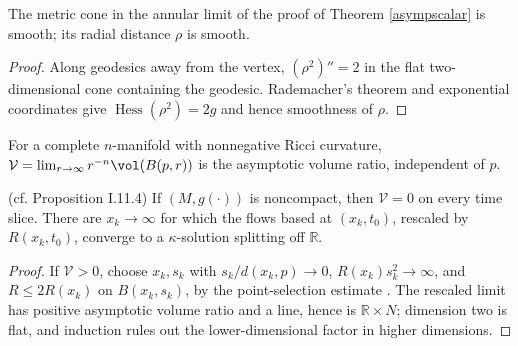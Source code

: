 \begin{lemma}
\label{lem:kl-asymptotic-scalar-curvature-asymptotic-volume-ratio-scalar-curvature-lemma}

The metric cone in the annular limit of the proof of
Theorem \ref{asympscalar} is smooth; its radial distance $\rho$ is smooth.
\end{lemma}
\begin{proof}
\sketch Along geodesics away from the vertex, $(\rho^2)''=2$ in the flat
two-dimensional cone containing the geodesic.  Rademacher's theorem and
exponential coordinates give $\operatorname{Hess}(\rho^2)=2g$ and hence
smoothness of $\rho$.
\end{proof}
\begin{definition}
\label{def:kl-asymptotic-scalar-curvature-asymptotic-volume-ratio-asymptotic-volume-ratio-definition}

For a complete $n$-manifold with nonnegative Ricci curvature,
$\mathcal V=\lim_{r\to\infty}r^{-n}\vol(B(p,r))$ is the asymptotic volume
ratio, independent of $p$.
\end{definition}
\begin{proposition}
\label{prop:kl-asymptotic-scalar-curvature-asymptotic-volume-ratio-existence-kappa-solutions}

(cf. Proposition I.11.4) \label{propI.11.4}
If $(M,g(\cdot))$ is noncompact, then $\mathcal V=0$ on every time slice.
There are $x_k\to\infty$ for which the flows based at $(x_k,t_0)$, rescaled
by $R(x_k,t_0)$, converge to a $\kappa$-solution splitting off $\mathbb R$.
\end{proposition}
\begin{proof}
\sketch If $\mathcal V>0$, choose $x_k,s_k$ with
$s_k/d(x_k,p)\to0$, $R(x_k)s_k^2\to\infty$, and $R\leq2R(x_k)$ on
$B(x_k,s_k)$, by the point-selection estimate \cite[Lemma 22.2]{Hamilton}.
The rescaled limit has positive asymptotic volume ratio and
a line, hence is $\mathbb R\times N$; dimension two is flat, and induction
rules out the lower-dimensional factor in higher dimensions.
\end{proof}

